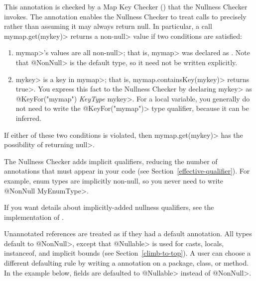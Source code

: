 This annotation is checked by a Map Key Checker
() that the Nullness Checker
invokes.  The  annotation enables
the Nullness Checker to treat calls to
precisely rather than assuming it may always return null.  In particular,
a call \<mymap.get(mykey)> returns a non-\<null> value if two conditions
are satisfied:
\begin{enumerate}
\item \<mymap>'s values are all non-\<null>; that is, \<mymap> was
  declared as .  Note
  that \<@NonNull> is the default type, so it need not be written explicitly.
\item \<mykey> is a key in \<mymap>; that is, \<mymap.containsKey(mykey)>
  returns \<true>.  You express this fact to the Nullness Checker by
  declaring \<mykey> as \<@KeyFor("mymap") \emph{KeyType} mykey>.  For a
  local variable, you generally do not need to write the
  \<@KeyFor("mymap")> type qualifier, because it can be inferred.
\end{enumerate}
\noindent
If either of these two conditions is violated, then \<mymap.get(mykey)> has
the possibility of returning \<null>.



The Nullness Checker
adds implicit qualifiers, reducing the number of annotations that must
appear in your code (see Section~\ref{effective-qualifier}).
For example, enum types are implicitly non-null, so you never need to write
\<@NonNull MyEnumType>.

If you want details about implicitly-added nullness qualifiers, see the
implementation of .




Unannotated references are treated as if they had a default annotation.
All types default to
\<@NonNull>, except that \<@Nullable> is used for casts, locals,
instanceof, and implicit bounds (see Section~\ref{climb-to-top}).
A user can choose a different defaulting
rule by writing a  annotation on a
 package, class, or method.  In the example below, fields are defaulted to
\<@Nullable> instead of \<@NonNull>.

